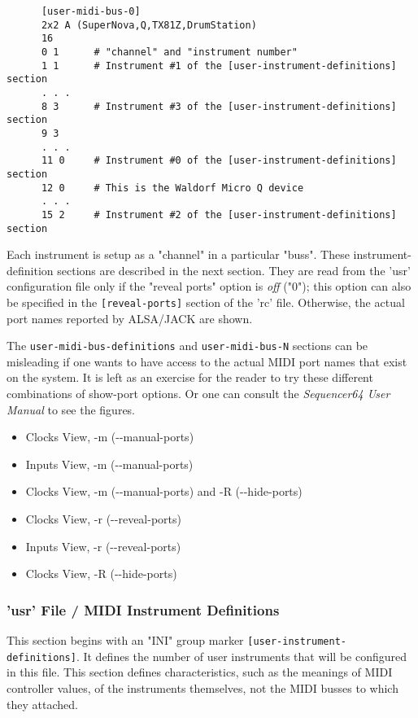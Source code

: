    \begin{verbatim}
      [user-midi-bus-0]
      2x2 A (SuperNova,Q,TX81Z,DrumStation)
      16
      0 1      # "channel" and "instrument number"
      1 1      # Instrument #1 of the [user-instrument-definitions] section
      . . .
      8 3      # Instrument #3 of the [user-instrument-definitions] section
      9 3
      . . .
      11 0     # Instrument #0 of the [user-instrument-definitions] section
      12 0     # This is the Waldorf Micro Q device
      . . .
      15 2     # Instrument #2 of the [user-instrument-definitions] section
   \end{verbatim}

   Each instrument is setup as a "channel" in a particular "buss".
   These instrument-definition sections are described in the next section.
   They are read from the 'usr' configuration file only if
   the "reveal ports" option is \textsl{off} ("0");
   this option can also be specified in the
   \texttt{[reveal-ports]} section of the 'rc' file.
   Otherwise, the actual port names reported by ALSA/JACK are shown.

   The \texttt{user-midi-bus-definitions} and \texttt{user-midi-bus-N} sections
   can be misleading if one wants to have access to the
   actual MIDI port names that exist on the system.
   It is left as an exercise for the reader to try these different combinations
   of show-port options.  Or one can consult the \textsl{Sequencer64 User
   Manual} to see the figures.

   \begin{itemize}
      \item Clocks View, -m (-{}-manual-ports)
      \item Inputs View, -m (-{}-manual-ports)
      \item Clocks View, -m (-{}-manual-ports) and -R (-{}-hide-ports)
      \item Clocks View, -r (-{}-reveal-ports)
      \item Inputs View, -r (-{}-reveal-ports)
      \item Clocks View, -R (-{}-hide-ports)
   \end{itemize}

\subsubsection{'usr' File / MIDI Instrument Definitions}
\label{subsubsec:usr_file_midi_instrument_definitions}

   This section begins with an
   "INI" group marker \texttt{[user-instrument-definitions]}.
   It defines the number of user instruments that will be configured in this
   file.  This section defines characteristics, such as
   the meanings of MIDI controller values, of the instruments themselves,
   not the MIDI busses to which they attached.

